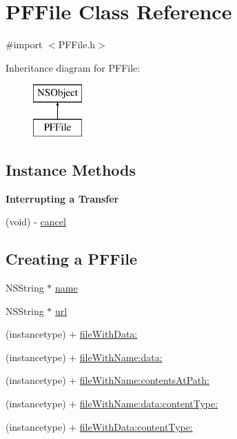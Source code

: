 \hypertarget{interface_p_f_file}{}\section{P\+F\+File Class Reference}
\label{interface_p_f_file}


{\ttfamily \#import $<$P\+F\+File.\+h$>$}

Inheritance diagram for P\+F\+File\+:\begin{figure}[H]
\begin{center}
\leavevmode
\includegraphics[height=2.000000cm]{interface_p_f_file}
\end{center}
\end{figure}
\subsection*{Instance Methods}
\begin{Indent}{\bf Interrupting a Transfer}\par
{\em 

 

 }\begin{DoxyCompactItemize}
\item 
(void) -\/ \hyperlink{interface_p_f_file_a4bfb537da098271602f871f111e8b7d7}{cancel}
\end{DoxyCompactItemize}
\end{Indent}
\subsection*{Creating a P\+F\+File}
\label{_amgrp292407309c3e24225c1a037cdff8d731}%


 

 \begin{DoxyCompactItemize}
\item 
N\+S\+String $\ast$ \hyperlink{interface_p_f_file_a7602815ca9a5e7628b2727ba7dd93b22}{name}
\item 
N\+S\+String $\ast$ \hyperlink{interface_p_f_file_ada906196949937fe800cc0cab2bc10e4}{url}
\item 
(instancetype) + \hyperlink{interface_p_f_file_a274b191dc89c3d4f59bfaf3bfd542adb}{file\+With\+Data\+:}
\item 
(instancetype) + \hyperlink{interface_p_f_file_acee1e5d9d9afc069c42dbc7f74f0a4b1}{file\+With\+Name\+:data\+:}
\item 
(instancetype) + \hyperlink{interface_p_f_file_a42e218fd948ec52c2568525095e97d00}{file\+With\+Name\+:contents\+At\+Path\+:}
\item 
(instancetype) + \hyperlink{interface_p_f_file_a7d63bb561115989271df08ec0c888ff4}{file\+With\+Name\+:data\+:content\+Type\+:}
\item 
(instancetype) + \hyperlink{interface_p_f_file_af4fdde536785b0c60ff6fe5ae63c273f}{file\+With\+Data\+:content\+Type\+:}
\end{DoxyCompactItemize}

